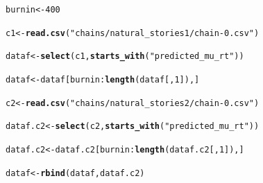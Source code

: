 \documentclass{article}\usepackage[]{graphicx}\usepackage[]{color}
\makeatletter
\newcommand{\hlnum}[1]{\textcolor[rgb]{0.686,0.059,0.569}{#1}}%
\newcommand{\hlstr}[1]{\textcolor[rgb]{0.192,0.494,0.8}{#1}}%
\newcommand{\hlopt}[1]{\textcolor[rgb]{0,0,0}{#1}}%
\newcommand{\hlstd}[1]{\textcolor[rgb]{0.345,0.345,0.345}{#1}}%
\newcommand{\hlkwb}[1]{\textcolor[rgb]{0.69,0.353,0.396}{#1}}%
\newcommand{\hlkwd}[1]{\textcolor[rgb]{0.737,0.353,0.396}{\textbf{#1}}}%
\newenvironment{kframe}{%
 \def\at@end@of@kframe{}%
 \ifinner\ifhmode%
  \def\at@end@of@kframe{\end{minipage}}%
  \begin{minipage}{\columnwidth}%
 \fi\fi%
 \def\FrameCommand##1{\hskip\@totalleftmargin \hskip-\fboxsep
 \colorbox{shadecolor}{##1}\hskip-\fboxsep
     \hskip-\linewidth \hskip-\@totalleftmargin \hskip\columnwidth}%
 \MakeFramed {\advance\hsize-\width
   \@totalleftmargin\z@ \linewidth\hsize
   \@setminipage}}%
 {\par\unskip\endMakeFramed%
 \at@end@of@kframe}
\newenvironment{knitrout}{}{} %
\makeatother
\begin{document}
\begin{knitrout}
\color{fgcolor}\begin{kframe}
\begin{alltt}
\hlstd{burnin} \hlkwb{<-} \hlnum{400}

\hlstd{c1} \hlkwb{<-} \hlkwd{read.csv}\hlstd{(}\hlstr{"chains/natural_stories1/chain-0.csv"}\hlstd{)}

\hlstd{dataf} \hlkwb{<-} \hlkwd{select}\hlstd{(c1,} \hlkwd{starts_with}\hlstd{(}\hlstr{"predicted_mu_rt"}\hlstd{))}

\hlstd{dataf} \hlkwb{<-} \hlstd{dataf[burnin}\hlopt{:}\hlkwd{length}\hlstd{(dataf[,} \hlnum{1}\hlstd{]), ]}

\hlstd{c2} \hlkwb{<-} \hlkwd{read.csv}\hlstd{(}\hlstr{"chains/natural_stories2/chain-0.csv"}\hlstd{)}

\hlstd{dataf.c2} \hlkwb{<-} \hlkwd{select}\hlstd{(c2,} \hlkwd{starts_with}\hlstd{(}\hlstr{"predicted_mu_rt"}\hlstd{))}

\hlstd{dataf.c2} \hlkwb{<-} \hlstd{dataf.c2[burnin}\hlopt{:}\hlkwd{length}\hlstd{(dataf.c2[,} \hlnum{1}\hlstd{]), ]}

\hlstd{dataf} \hlkwb{<-} \hlkwd{rbind}\hlstd{(dataf, dataf.c2)}


\end{alltt}
\end{kframe}
\end{knitrout}
\end{document}
